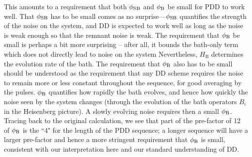 \documentclass[pra,reprint,superscriptaddress]{revtex4-2}
\begin{document}
This amounts to a requirement that both $\phi_{\mathrm{SB}}$ and $\phi_{\mathrm{B}}$ be small for PDD to work well. That $\phi_{\mathrm{SB}}$ has to be small comes as no surprise---$\phi_{\mathrm{SB}}$ quantifies the strength of the noise on the system, and DD is expected to work well as long as the noise is weak enough so that the remnant noise is weak. The requirement that $\phi_{\mathrm{B}}$ be small is perhaps a bit more surprising -- after all, it bounds the bath-only term which does not directly lead to noise on the system Nevertheless, $H_\mathrm{B}$ determines the evolution rate of the bath. The requirement that $\phi_{\mathrm{B}}$ also has to be small should be understood as the requirement that any DD scheme requires the noise to remain more or less constant throughout the sequence, for good averaging by the pulses. $\phi_{\mathrm{B}}$ quantifies how rapidly the bath evolves, and hence how quickly the noise seen by the system changes (through the evolution of the bath operators $B_i$ in the Heisenberg picture). A slowly evolving noise requires then a small $\phi_{\mathrm{B}}$. Tracing back to the original calculation, we see that part of the pre-factor of 12 of $\phi_{\mathrm{B}}$ is the ``4" for the length of the PDD sequence; a longer sequence will have a larger pre-factor and hence a more stringent requirement that $\phi_{\mathrm{B}}$ is small, consistent with our interpretation here and our standard understanding of DD.
\end{document}
